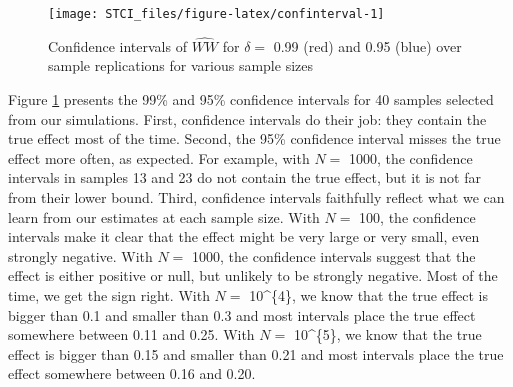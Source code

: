 \documentclass[]{book}
\newenvironment{Shaded}{\begin{snugshade}}{\end{snugshade}}
\newcommand{\KeywordTok}[1]{\textcolor[rgb]{0.13,0.29,0.53}{\textbf{#1}}}
\newcommand{\DataTypeTok}[1]{\textcolor[rgb]{0.13,0.29,0.53}{#1}}
\newcommand{\DecValTok}[1]{\textcolor[rgb]{0.00,0.00,0.81}{#1}}
\newcommand{\StringTok}[1]{\textcolor[rgb]{0.31,0.60,0.02}{#1}}
\newcommand{\CommentTok}[1]{\textcolor[rgb]{0.56,0.35,0.01}{\textit{#1}}}
\newcommand{\OperatorTok}[1]{\textcolor[rgb]{0.81,0.36,0.00}{\textbf{#1}}}
\newcommand{\NormalTok}[1]{#1}
\theoremstyle{definition}
\theoremstyle{definition}
\theoremstyle{definition}
\theoremstyle{remark}
\begin{document}
\begin{Shaded}
\end{Shaded}

\begin{figure}[htbp]

{\centering \texttt{[image: STCI\_files/figure-latex/confinterval-1]} 

}

\caption{Confidence intervals of $\hat{WW}$ for $\delta=$ 0.99 (red) and 0.95 (blue) over sample replications for various sample sizes}\label{fig:confinterval}
\end{figure}

Figure \ref{fig:confinterval} presents the 99\% and 95\% confidence
intervals for 40 samples selected from our simulations. First,
confidence intervals do their job: they contain the true effect most of
the time. Second, the 95\% confidence interval misses the true effect
more often, as expected. For example, with \(N=\) 1000, the confidence
intervals in samples 13 and 23 do not contain the true effect, but it is
not far from their lower bound. Third, confidence intervals faithfully
reflect what we can learn from our estimates at each sample size. With
\(N=\) 100, the confidence intervals make it clear that the effect might
be very large or very small, even strongly negative. With \(N=\) 1000,
the confidence intervals suggest that the effect is either positive or
null, but unlikely to be strongly negative. Most of the time, we get the
sign right. With \(N=\) 10\^{}\{4\}, we know that the true effect is
bigger than 0.1 and smaller than 0.3 and most intervals place the true
effect somewhere between 0.11 and 0.25. With \(N=\) 10\^{}\{5\}, we know
that the true effect is bigger than 0.15 and smaller than 0.21 and most
intervals place the true effect somewhere between 0.16 and 0.20.
\end{document}

